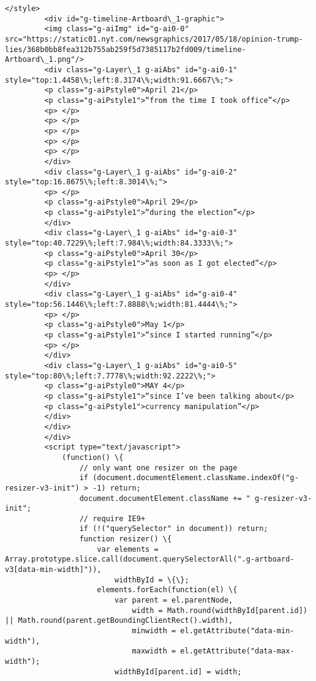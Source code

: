 \documentclass[11pt]{article}
\begin{document}
\begin{Verbatim}[commandchars=\\\{\}]
         		</style>
         <div id="g-timeline-Artboard\_1-graphic">
         <img class="g-aiImg" id="g-ai0-0" src="https://static01.nyt.com/newsgraphics/2017/05/18/opinion-trump-lies/368b0bb8fea312b755ab259f5d7385117b2fd009/timeline-Artboard\_1.png"/>
         <div class="g-Layer\_1 g-aiAbs" id="g-ai0-1" style="top:1.4458\%;left:8.3174\%;width:91.6667\%;">
         <p class="g-aiPstyle0">April 21</p>
         <p class="g-aiPstyle1">“from the time I took office”</p>
         <p> </p>
         <p> </p>
         <p> </p>
         <p> </p>
         <p> </p>
         </div>
         <div class="g-Layer\_1 g-aiAbs" id="g-ai0-2" style="top:16.8675\%;left:8.3014\%;">
         <p> </p>
         <p class="g-aiPstyle0">April 29</p>
         <p class="g-aiPstyle1">“during the election”</p>
         </div>
         <div class="g-Layer\_1 g-aiAbs" id="g-ai0-3" style="top:40.7229\%;left:7.984\%;width:84.3333\%;">
         <p class="g-aiPstyle0">April 30</p>
         <p class="g-aiPstyle1">“as soon as I got elected”</p>
         <p> </p>
         </div>
         <div class="g-Layer\_1 g-aiAbs" id="g-ai0-4" style="top:56.1446\%;left:7.8888\%;width:81.4444\%;">
         <p> </p>
         <p class="g-aiPstyle0">May 1</p>
         <p class="g-aiPstyle1">“since I started running”</p>
         <p> </p>
         </div>
         <div class="g-Layer\_1 g-aiAbs" id="g-ai0-5" style="top:80\%;left:7.7778\%;width:92.2222\%;">
         <p class="g-aiPstyle0">MAY 4</p>
         <p class="g-aiPstyle1">“since I’ve been talking about</p>
         <p class="g-aiPstyle1">currency manipulation”</p>
         </div>
         </div>
         </div>
         <script type="text/javascript">
             (function() \{
                 // only want one resizer on the page
                 if (document.documentElement.className.indexOf("g-resizer-v3-init") > -1) return;
                 document.documentElement.className += " g-resizer-v3-init";
                 // require IE9+
                 if (!("querySelector" in document)) return;
                 function resizer() \{
                     var elements = Array.prototype.slice.call(document.querySelectorAll(".g-artboard-v3[data-min-width]")),
                         widthById = \{\};
                     elements.forEach(function(el) \{
                         var parent = el.parentNode,
                             width = Math.round(widthById[parent.id]) || Math.round(parent.getBoundingClientRect().width),
                             minwidth = el.getAttribute("data-min-width"),
                             maxwidth = el.getAttribute("data-max-width");
                         widthById[parent.id] = width;
         

\end{Verbatim}
\end{document}
